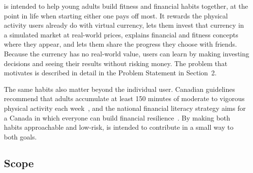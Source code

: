 \documentclass[12pt]{article}
\begin{document}


\progname{} is intended to help young adults build fitness and financial
habits together, at the point in life when starting either one pays off most.
It rewards the physical activity users already do with virtual currency, lets
them invest that currency in a simulated market at real-world prices, explains
financial and fitness concepts where they appear, and lets them share the
progress they choose with friends. Because the currency has no real-world
value, users can learn by making investing decisions and seeing their results
without risking money. The problem that motivates \progname{} is described in
detail in the Problem Statement in Section~2.

The same habits also matter beyond the individual user. Canadian guidelines
recommend that adults accumulate at least 150 minutes of moderate to vigorous
physical activity each week~\citep{CSEP2020}, and the national financial
literacy strategy aims for a Canada in which everyone can build financial
resilience~\citep{FCAC2021}. By making both habits approachable and
low-risk, \progname{} is intended to contribute in a small way to both goals.

\subsection{Scope}

\end{document}
